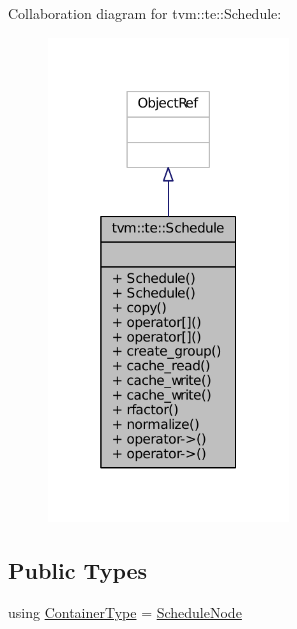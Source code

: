 Collaboration diagram for tvm\+:\+:te\+:\+:Schedule\+:
\nopagebreak
\begin{figure}[H]
\begin{center}
\leavevmode
\includegraphics[width=181pt]{classtvm_1_1te_1_1Schedule__coll__graph}
\end{center}
\end{figure}
\subsection*{Public Types}
\begin{DoxyCompactItemize}
\item 
using \hyperlink{classtvm_1_1te_1_1Schedule_afba006836979a74a799189169534189e}{Container\+Type} = \hyperlink{classtvm_1_1te_1_1ScheduleNode}{Schedule\+Node}
\end{DoxyCompactItemize}
